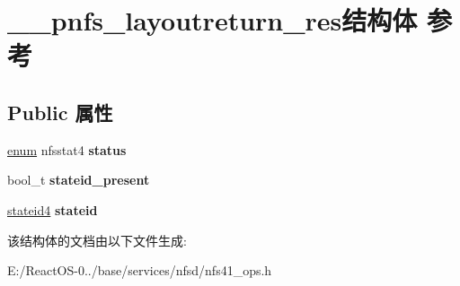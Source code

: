 \hypertarget{struct____pnfs__layoutreturn__res}{}\section{\+\_\+\+\_\+pnfs\+\_\+layoutreturn\+\_\+res结构体 参考}
\label{struct____pnfs__layoutreturn__res}
\subsection*{Public 属性}
\begin{DoxyCompactItemize}
\item 
\mbox{\label{struct____pnfs__layoutreturn__res_a653f58fb9051f09ba4063ae8cb340e42}} 
\hyperlink{interfaceenum}{enum} nfsstat4 {\bfseries status}
\item 
\mbox{\label{struct____pnfs__layoutreturn__res_a8fd009368dc5ac216861f64cb291beef}} 
bool\+\_\+t {\bfseries stateid\+\_\+present}
\item 
\mbox{\label{struct____pnfs__layoutreturn__res_a6ebbfadf634818bd6f15c0593e69b39a}} 
\hyperlink{struct____stateid4}{stateid4} {\bfseries stateid}
\end{DoxyCompactItemize}


该结构体的文档由以下文件生成\+:\begin{DoxyCompactItemize}
\item 
E\+:/\+React\+O\+S-\/0../base/services/nfsd/nfs41\+\_\+ops.\+h\end{DoxyCompactItemize}
